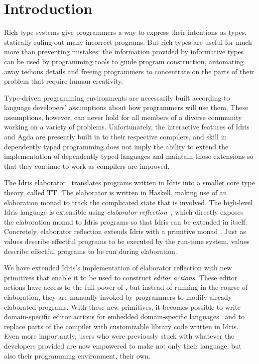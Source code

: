 \section{Introduction} \label{sec:introduction}

Rich type systems give programmers a way to express their intentions
as types, statically ruling out many incorrect programs. But rich
types are useful for much more than preventing mistakes: the
information provided by informative types can be used by programming
tools to guide program construction, automating away tedious details
and freeing programmers to concentrate on the parts of their
problem that require human creativity.

Type-driven programming environments are necessarily built according
to language developers' assumptions about how programmers will use
them. These assumptions, however, can never hold for all members of a
diverse community working on a variety of problems. Unfortunately, the
interactive features of Idris and Agda are presently built in to their
respective compilers, and skill in dependently typed programming does
not imply the ability to extend the implementation of dependently
typed languages and maintain those extensions so that they continue to
work as compilers are improved.

The Idris elaborator~\citep{idris} translates programs written in
Idris into a smaller core type theory, called \textsf{TT}.
The elaborator is written
in Haskell, making use of an elaboration monad to track the
complicated state that is involved. The high-level Idris language is
extensible using \emph{elaborator reflection}~\citep{davidphd,
  elabref}, which directly exposes the elaboration monad to Idris
programs so that Idris can be extended in itself. Concretely,
elaborator reflection extends Idris with a primitive monad
\Elab{}. Just as \IO{} values describe effectful programs to be
executed by the run-time system, \Elab{} values describe effectful
programs to be run during elaboration.

We have extended Idris's implementation of elaborator reflection with
new primitives that enable it to be used to construct \emph{editor
  actions}. These editor actions have access to the full power of
\Elab{}, but instead of running in the course of elaboration, they are
manually invoked by programmers to modify already-elaborated programs.
With these new primitives, it becomes possible to write
domain-specific editor actions for embedded domain-specific
languages~\citep{dsel} and to replace parts of the compiler with
customizable library code written in Idris. Even more importantly,
users who were previously stuck with whatever the developers provided
are now empowered to make not only their language, but also their programming
environment, their own.

